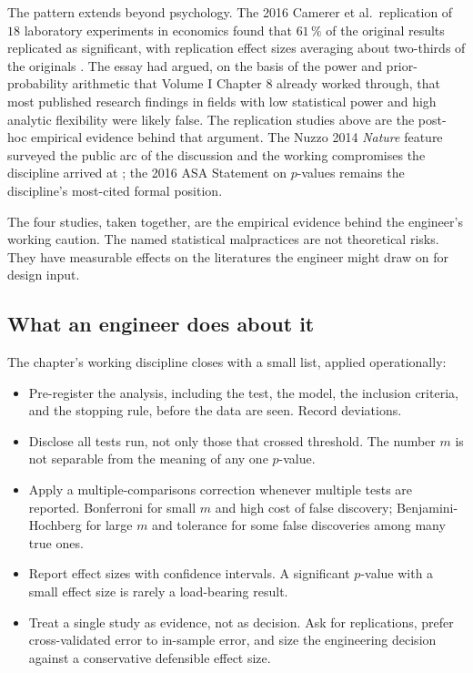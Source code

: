 The pattern extends beyond psychology. The 2016 Camerer et al.\
replication of $18$ laboratory experiments in economics found
that $61\,\%$ of the original results replicated as significant,
with replication effect sizes averaging about two-thirds of the
originals \cite{method:v2ch14-camerer-economics-2016}. The
\textcite{method:ch08-ioannidis-2005} essay had argued, on the
basis of the power and prior-probability arithmetic that Volume I
Chapter 8 already worked through, that most published research
findings in fields with low statistical power and high analytic
flexibility were likely false. The replication studies above are
the post-hoc empirical evidence behind that argument. The Nuzzo
2014 \textit{Nature} feature surveyed the public arc of the
discussion and the working compromises the discipline arrived at
\cite{method:v2ch14-nuzzo-scientific-method-2014}; the 2016 ASA
Statement on $p$-values \cite{method:ch08-wasserstein-asa-2016}
remains the discipline's most-cited formal position.

The four studies, taken together, are the empirical evidence
behind the engineer's working caution. The named statistical
malpractices are not theoretical risks. They have measurable
effects on the literatures the engineer might draw on for design
input.

\subsection{What an engineer does about it}

The chapter's working discipline closes with a small list, applied
operationally:

\begin{itemize}[leftmargin=*]
  \item Pre-register the analysis, including the test, the model,
    the inclusion criteria, and the stopping rule, before the data
    are seen. Record deviations.
  \item Disclose all tests run, not only those that crossed
    threshold. The number $m$ is not separable from the meaning of
    any one $p$-value.
  \item Apply a multiple-comparisons correction whenever multiple
    tests are reported. Bonferroni for small $m$ and high cost of
    false discovery; Benjamini-Hochberg for large $m$ and tolerance
    for some false discoveries among many true ones.
  \item Report effect sizes with confidence intervals. A
    significant $p$-value with a small effect size is rarely a
    load-bearing result.
  \item Treat a single study as evidence, not as decision. Ask
    for replications, prefer cross-validated error to in-sample
    error, and size the engineering decision against a conservative
    defensible effect size.
\end{itemize}

